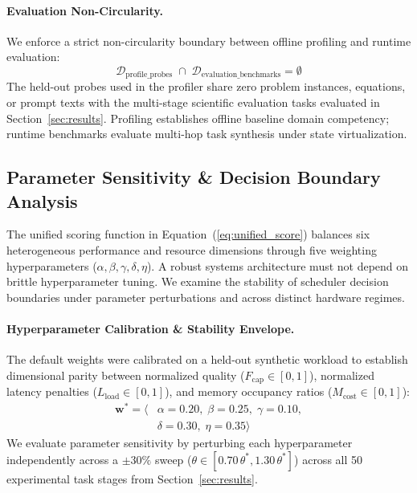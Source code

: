 \paragraph{Evaluation Non-Circularity.}
We enforce a strict non-circularity boundary between offline profiling and runtime evaluation:
\begin{equation}
\mathcal{D}_{\text{profile\_probes}} \;\cap\; \mathcal{D}_{\text{evaluation\_benchmarks}} = \emptyset
\end{equation}
The held-out probes used in the profiler share zero problem instances, equations, or prompt texts with the multi-stage scientific evaluation tasks evaluated in Section~\ref{sec:results}. Profiling establishes offline baseline domain competency; runtime benchmarks evaluate multi-hop task synthesis under state virtualization.

\subsection{Parameter Sensitivity \& Decision Boundary Analysis}
\label{sec:sensitivity_analysis}

The unified scoring function in Equation~(\ref{eq:unified_score}) balances six heterogeneous performance and resource dimensions through five weighting hyperparameters ($\alpha, \beta, \gamma, \delta, \eta$). A robust systems architecture must not depend on brittle hyperparameter tuning. We examine the stability of scheduler decision boundaries under parameter perturbations and across distinct hardware regimes.

\paragraph{Hyperparameter Calibration \& Stability Envelope.}
The default weights were calibrated on a held-out synthetic workload to establish dimensional parity between normalized quality ($F_{\text{cap}} \in [0, 1]$), normalized latency penalties ($L_{\text{load}} \in [0, 1]$), and memory occupancy ratios ($M_{\text{cost}} \in [0, 1]$):
\begin{equation}
\begin{aligned}
\mathbf{w}^* = \langle &\alpha=0.20, \;\beta=0.25, \;\gamma=0.10, \\
&\delta=0.30, \;\eta=0.35 \rangle
\end{aligned}
\end{equation}
We evaluate parameter sensitivity by perturbing each hyperparameter independently across a $\pm 30\%$ sweep ($\theta \in [0.70\,\theta^*, 1.30\,\theta^*]$) across all 50 experimental task stages from Section~\ref{sec:results}. 

